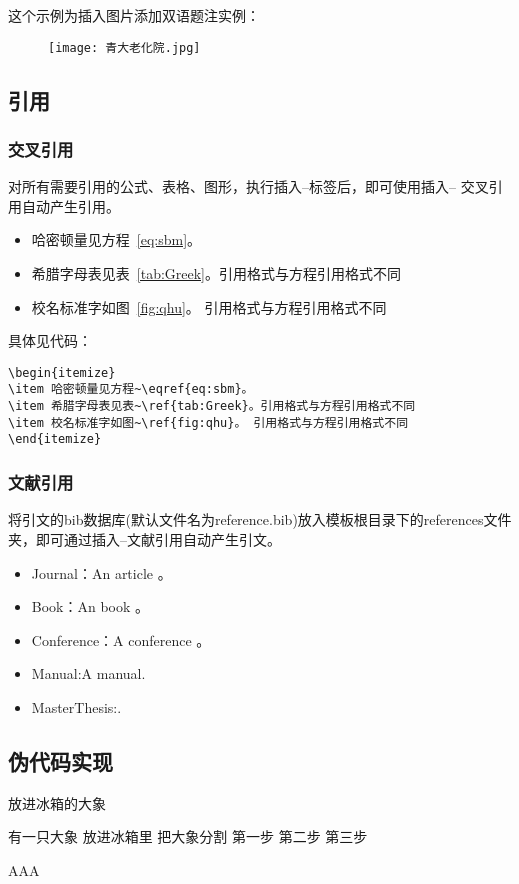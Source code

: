 这个示例为插入图片添加双语题注实例：
\begin{figure}[H]
	\centering
	\texttt{[image: 青大老化院.jpg]}  %
\end{figure}
\subsection{引用}
\subsubsection{交叉引用}
对所有需要引用的公式、表格、图形，执行插入--标签后，即可使用插入-- 交叉引用自动产生引用。
\begin{itemize}
\item 哈密顿量见方程~\eqref{eq:sbm}。
\item 希腊字母表见表~\ref{tab:Greek}。引用格式与方程引用格式不同
\item 校名标准字如图~\ref{fig:qhu}。 引用格式与方程引用格式不同
\end{itemize}
具体见代码：
\begin{verbatim}
\begin{itemize}
\item 哈密顿量见方程~\eqref{eq:sbm}。
\item 希腊字母表见表~\ref{tab:Greek}。引用格式与方程引用格式不同
\item 校名标准字如图~\ref{fig:qhu}。 引用格式与方程引用格式不同
\end{itemize}
\end{verbatim}
\subsubsection{文献引用}
将引文的bib数据库(默认文件名为reference.bib)放入模板根目录下的references文件夹，即可通过插入--文献引用自动产生引文。
\begin{itemize}
\item Journal：An article \cite{ELIDRISSI94,MELLINGER96,SHELL02,cnarticle}。
\item Book：An book \cite{IEEE-1363,tex,companion}。
\item Conference：A conference \cite{kocher99,DPMG,cnproceed}。
\item Manual:A manual\cite{NPB2}.
\item MasterThesis:\cite{zhubajie,metamori2004,shaheshang,FistSystem01}.
\end{itemize}
\subsection{伪代码实现}
\begin{algorithm}
\caption{放进冰箱的大象}\label{算法实例}
\begin{algorithmic}
	\REQUIRE 有一只大象
	\ENSURE 放进冰箱里
	\STATE 把大象分割
	\ENDIF
	\ENDFOR
	\STATE 第一步
	\STATE 第二步
	\STATE 第三步
\end{algorithmic}
AAA\end{algorithm}
